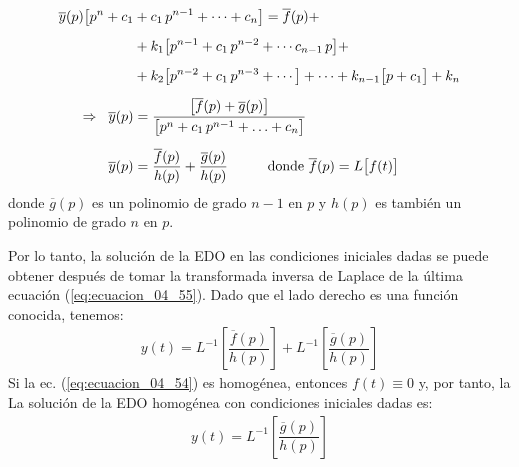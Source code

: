 \begin{align}
\begin{aligned}[b]
\overline{y}(p) \big[ p^{n} + c_{1} &+ c_{1} \, p^{n-1} + \cdots + c_{n} \big] = \overline{f}(p) + \\[0.5em]
&+ k_{1} \big[ p^{n-1} + c_{1} \, p^{n-2} + \cdots c_{n-1} \, p \big] + \\[0.5em]
&+ k_{2} \big[ p^{n-2} + c_{1} \, p^{n-3} + \cdots \big] + \cdots + k_{n-1} \big[ p + c_{1} \big] + k_{n} \\[0.5em]
\Rightarrow \hspace{0.2cm} \overline{y}(p) &= \dfrac{\big[\overline{f}(p) + \overline{g}(p) \big]}{\big[p^{n}+ c_{1} \, p^{n-1} + \ldots + c_{n}\big]} \\[0.5em]
\overline{y}(p) &= \dfrac{\overline{f}(p)}{h(p)} + \dfrac{\overline{g}(p)}{h(p)} \hspace{1cm} \mbox{donde } \overline{f} (p) = L \big[ f(t) \big]
\end{aligned}
\label{eq:ecuacion_04_55}
\end{align}
donde $\overline{g}(p)$ es un polinomio de grado $n-1$ en $p$ y $h(p)$ es también un polinomio de grado $n$ en $p$.
\par
Por lo tanto, la solución de la EDO en las condiciones iniciales dadas se puede obtener después de tomar la transformada inversa de Laplace de la última ecuación (\ref{eq:ecuacion_04_55}). Dado que el lado derecho es una función conocida, tenemos:
\begin{align}
y(t) = L^{-1} \left[ \dfrac{\overline{f}(p)}{h(p)} \right] + L^{-1} \left[ \dfrac{\overline{g}(p)}{h(p)} \right]
\label{eq:ecuacion_04_56}
\end{align}
Si la ec. (\ref{eq:ecuacion_04_54}) es homogénea, entonces $f (t) \equiv 0$ y, por tanto, la La solución de la EDO homogénea con condiciones iniciales dadas es:
\begin{align}
y(t) = L^{-1} \left[ \dfrac{\overline{g}(p)}{h(p)} \right]
\label{eq:ecuacion_04_57}
\end{align}

